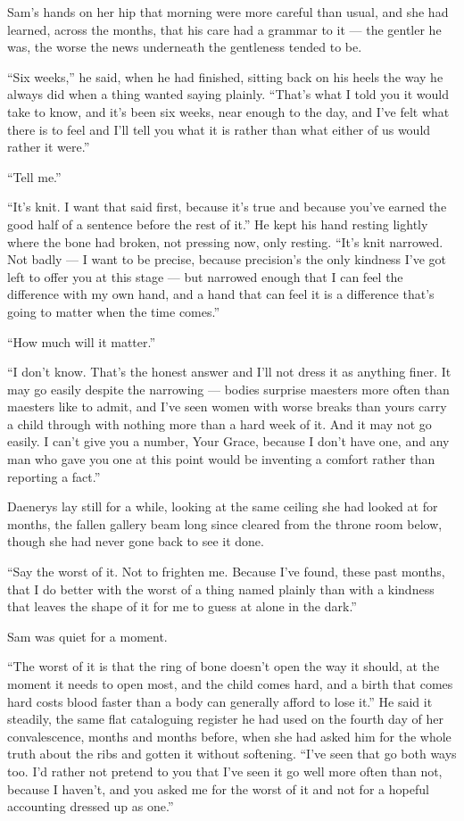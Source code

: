 Sam’s hands on her hip that morning were more careful than usual, and she had learned, across the months, that his care had a grammar to it — the gentler he was, the worse the news underneath the gentleness tended to be.

“Six weeks,” he said, when he had finished, sitting back on his heels the way he always did when a thing wanted saying plainly. “That’s what I told you it would take to know, and it’s been six weeks, near enough to the day, and I’ve felt what there is to feel and I’ll tell you what it is rather than what either of us would rather it were.”

“Tell me.”

“It’s knit. I want that said first, because it’s true and because you’ve earned the good half of a sentence before the rest of it.” He kept his hand resting lightly where the bone had broken, not pressing now, only resting. “It’s knit narrowed. Not badly — I want to be precise, because precision’s the only kindness I’ve got left to offer you at this stage — but narrowed enough that I can feel the difference with my own hand, and a hand that can feel it is a difference that’s going to matter when the time comes.”

“How much will it matter.”

“I don’t know. That’s the honest answer and I’ll not dress it as anything finer. It may go easily despite the narrowing — bodies surprise maesters more often than maesters like to admit, and I’ve seen women with worse breaks than yours carry a child through with nothing more than a hard week of it. And it may not go easily. I can’t give you a number, Your Grace, because I don’t have one, and any man who gave you one at this point would be inventing a comfort rather than reporting a fact.”

Daenerys lay still for a while, looking at the same ceiling she had looked at for months, the fallen gallery beam long since cleared from the throne room below, though she had never gone back to see it done.

“Say the worst of it. Not to frighten me. Because I’ve found, these past months, that I do better with the worst of a thing named plainly than with a kindness that leaves the shape of it for me to guess at alone in the dark.”

Sam was quiet for a moment.

“The worst of it is that the ring of bone doesn’t open the way it should, at the moment it needs to open most, and the child comes hard, and a birth that comes hard costs blood faster than a body can generally afford to lose it.” He said it steadily, the same flat cataloguing register he had used on the fourth day of her convalescence, months and months before, when she had asked him for the whole truth about the ribs and gotten it without softening. “I’ve seen that go both ways too. I’d rather not pretend to you that I’ve seen it go well more often than not, because I haven’t, and you asked me for the worst of it and not for a hopeful accounting dressed up as one.”

